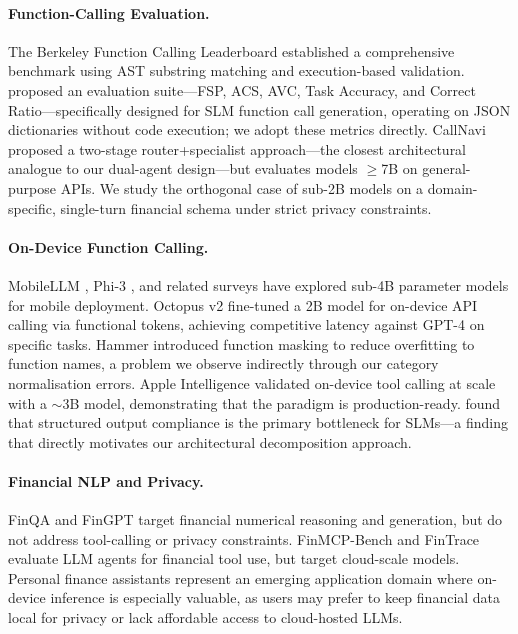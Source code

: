 \documentclass[11pt,twocolumn]{article}
\begin{document}
\paragraph{Function-Calling Evaluation.}
The Berkeley Function Calling Leaderboard \citep{yan2024bfcl} established a comprehensive benchmark using AST substring matching and execution-based validation.
\citet{kavathekar2025small} proposed an evaluation suite---FSP, ACS, AVC, Task Accuracy, and Correct Ratio---specifically designed for SLM function call generation, operating on JSON dictionaries without code execution; we adopt these metrics directly.
CallNavi \citep{callnavi2025} proposed a two-stage router+specialist approach---the closest architectural analogue to our dual-agent design---but evaluates models $\geq$7B on general-purpose APIs.
We study the orthogonal case of sub-2B models on a domain-specific, single-turn financial schema under strict privacy constraints.

\paragraph{On-Device Function Calling.}
MobileLLM \citep{liu2024mobilellm}, Phi-3 \citep{abdin2024phi3}, and related surveys \citep{xu2024ondevice} have explored sub-4B parameter models for mobile deployment.
Octopus v2 \citep{chen2024octopus} fine-tuned a 2B model for on-device API calling via functional tokens, achieving competitive latency against GPT-4 on specific tasks.
Hammer \citep{lin2024hammer} introduced function masking to reduce overfitting to function names, a problem we observe indirectly through our category normalisation errors.
Apple Intelligence \citep{gunter2024apple} validated on-device tool calling at scale with a $\sim$3B model, demonstrating that the paradigm is production-ready.
\citet{kavathekar2025small} found that structured output compliance is the primary bottleneck for SLMs---a finding that directly motivates our architectural decomposition approach.

\paragraph{Financial NLP and Privacy.}
FinQA \citep{chen2022finqa} and FinGPT \citep{yang2023fingpt} target financial numerical reasoning and generation, but do not address tool-calling or privacy constraints.
FinMCP-Bench \citep{finmcpbench2026} and FinTrace \citep{fintrace2026} evaluate LLM agents for financial tool use, but target cloud-scale models.
Personal finance assistants \citep{li2024personal} represent an emerging application domain where on-device inference is especially valuable, as users may prefer to keep financial data local for privacy or lack affordable access to cloud-hosted LLMs.
\end{document}
